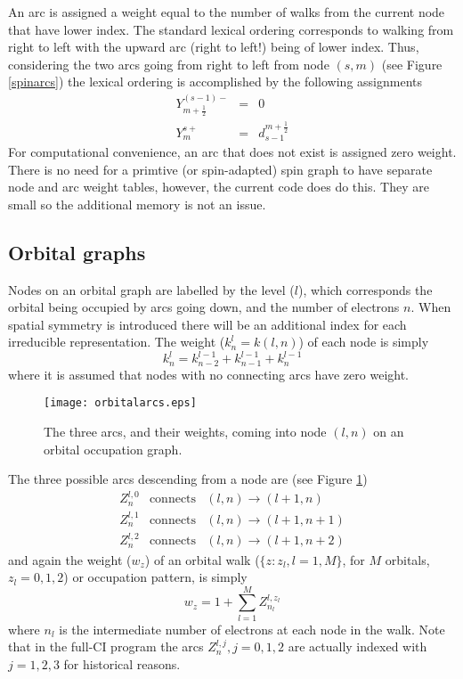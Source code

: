 \documentclass[fullpage,12pt,fleqn]{article}
\newcommand{\half}{\frac{1}{2}}
\begin{document}
An arc is assigned a weight equal to the number of walks from
the current node that have lower index.  The standard lexical ordering
corresponds to walking from right to left with the upward arc (right
to left!) being of lower index.  Thus, considering the two arcs going
from right to left from node $(s,m)$ 
(see Figure \ref{spinarcs}) the lexical ordering is
accomplished by the following assignments
\begin{eqnarray}
  Y^{(s-1)-}_{m+\half} & = & 0 \nonumber \\ 
  Y^{s+}_m & = & d_{s-1}^{m+\half}  \label{spinarcweights}
\end{eqnarray}
For computational convenience, an arc that does not exist is assigned
zero weight.  There is no need for a primtive (or spin-adapted) spin
graph to have separate node and arc weight tables, however, the
current code does do this.  They are small so the additional memory is
not an issue.

\subsection{Orbital graphs}

Nodes on an orbital graph are labelled by the level ($l$), which
corresponds the orbital being occupied by arcs going down, and the
number of electrons $n$.  When spatial symmetry is introduced there
will be an additional index for each irreducible representation.  The
weight ($k^l_n = k(l,n)$) of each node is simply
\begin{equation}
  k^l_n = k^{l-1}_{n-2} + k^{l-1}_{n-1} + k^{l-1}_n \label{orbnodeweight}
\end{equation}
where it is assumed that nodes with no connecting arcs have zero weight.

\begin{figure}[htbp]

\center

\texttt{[image: orbitalarcs.eps]}
\caption{\label{orbitalarcs} The three arcs, and their weights,
coming into node $(l,n)$ on an orbital occupation graph.}
\end{figure}

The three possible arcs descending from a node are (see Figure
\ref{orbitalarcs})
\begin{eqnarray}
 Z^{l,0}_{n} & \mbox{connects} & (l,n) \rightarrow (l+1,n) \\
 Z^{l,1}_{n} & \mbox{connects} & (l,n) \rightarrow (l+1,n+1) \\
 Z^{l,2}_{n} & \mbox{connects} & (l,n) \rightarrow (l+1,n+2)
\end{eqnarray}
and again the weight ($w_z$) of an orbital walk ($\{z: z_l,l=1,M\}$, for
$M$ orbitals, $z_l=0,1,2$) or occupation pattern, is simply
\begin{equation}
  w_z = 1 + \sum_{l=1}^{M} Z^{l,z_l}_{n_l} \label{orbwalkweight}
\end{equation}
where $n_l$ is the intermediate number of electrons at each node in
the walk.  Note that in the full-CI program the arcs $Z^{l,j}_n,
j=0,1,2$ are actually indexed with $j=1,2,3$ for historical reasons.
\end{document}
